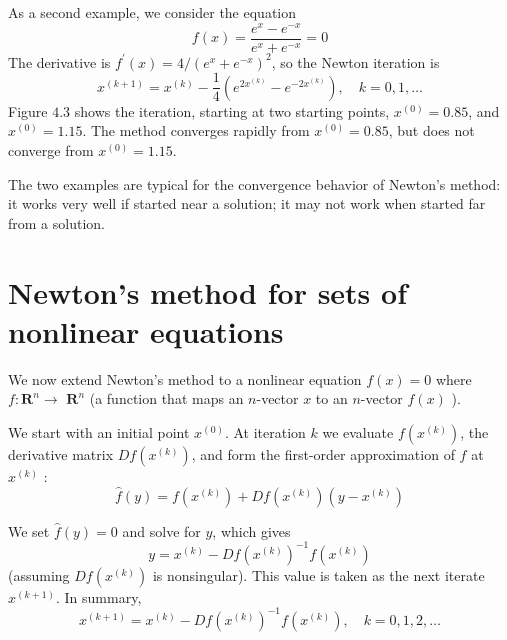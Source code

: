 \begin{example}
    As a second example, we consider the equation
\begin{equation}
f(x)=\frac{e^{x}-e^{-x}}{e^{x}+e^{-x}}=0
\end{equation}
The derivative is $ f^{\prime}(x)=4 /\left(e^{x}+e^{-x}\right)^{2} $, so the Newton iteration is
\begin{equation}
x^{(k+1)}=x^{(k)}-\frac{1}{4}\left(e^{2 x^{(k)}}-e^{-2 x^{(k)}}\right), \quad k=0,1, \ldots
\end{equation}
Figure $ 4.3 $ shows the iteration, starting at two starting points, $ x^{(0)}=0.85 $, and $ x^{(0)}=1.15 $. The method converges rapidly from $ x^{(0)}=0.85 $, but does not converge from $ x^{(0)}=1.15 $.

The two examples are typical for the convergence behavior of Newton's method: it works very well if started near a solution; it may not work when started far from a solution.
\end{example}

\section{Newton's method for sets of nonlinear equations}

We now extend Newton's method to a nonlinear equation $ f(x)=0 $ where $ f: \mathbf{R}^{n} \rightarrow $ $ \mathbf{R}^{n} $ (a function that maps an $ n $-vector $ x $ to an $ n $-vector $ f(x) $ ).

We start with an initial point $ x^{(0)} $. At iteration $ k $ we evaluate $ f\left(x^{(k)}\right) $, the derivative matrix $ D f\left(x^{(k)}\right) $, and form the first-order approximation of $ f $ at $ x^{(k)} $ :
\begin{equation}
\hat{f}(y)=f\left(x^{(k)}\right)+D f\left(x^{(k)}\right)\left(y-x^{(k)}\right)
\end{equation}

We set $ \hat{f}(y)=0 $ and solve for $ y $, which gives
\begin{equation}
y=x^{(k)}-D f\left(x^{(k)}\right)^{-1} f\left(x^{(k)}\right)
\end{equation}
(assuming $ D f\left(x^{(k)}\right) $ is nonsingular). This value is taken as the next iterate $ x^{(k+1)} $. In summary,
\begin{equation}
x^{(k+1)}=x^{(k)}-D f\left(x^{(k)}\right)^{-1} f\left(x^{(k)}\right), \quad k=0,1,2, \ldots
\end{equation}

